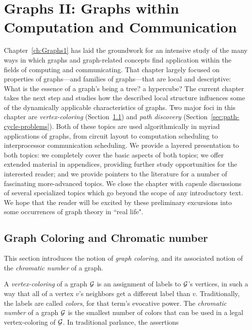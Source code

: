 
\chapter{Graphs II:
Graphs within Computation and Communication}
\label{ch:Graphs2}

Chapter~\ref{ch:Graphs1} has laid the groundwork for an intensive study of the many 
ways in which graphs and graph-related concepts find application within the fields of 
computing and communicating.  That chapter largely focused on properties of
graphs---and families of graphs---that are local and descriptive: What is the essence of
a graph's being a tree? a hypercube?  The current chapter takes the next step and studies
how the described local structure influences some of the dynamically applicable characteristics
of graphs.  Two major foci in this chapter are {\em vertex-coloring} (Section~\ref{sec:graph-color})
and {\em path discovery} (Section~\ref{sec:path-cycle-problems}).  Both of these topics are used
algorithmically in myriad applications of graphs, from circuit layout to computation scheduling
to interprocessor communication scheduling.  We provide a layered presentation to both topics:
we completely cover the basic aspects of both topics; we offer extended material in appendices,
providing further study opportunities for the interested reader; and we provide pointers to the 
literature for a number of fascinating more-advanced topics.  We close the chapter with capsule
discussions of several specialized topics which go beyond the scope of any introductory text.  We 
hope that the reader will be excited by these preliminary excursions into some occurrences of
graph theory in ``real life".



\section{Graph Coloring and Chromatic number}
\label{sec:graph-color}

This section introduces the notion of {\it graph coloring}, and its
associated notion of the {\it chromatic number} of a graph.

A {\it vertex-coloring} of a graph $\mbox{$\cal G$}$ is an assignment of labels to $\mbox{$\cal G$}$'s vertices, 
in such a way that all of a vertex $v$'s neighbors get a different label than $v$.  Traditionally,
the labels are called {\it colors}, for that term's evocative power.  The {\it chromatic number} of a graph
$\mbox{$\cal G$}$ is the smallest number of colors that can be used in a legal
vertex-coloring of $\mbox{$\cal G$}$.  In traditional parlance, the assertions


